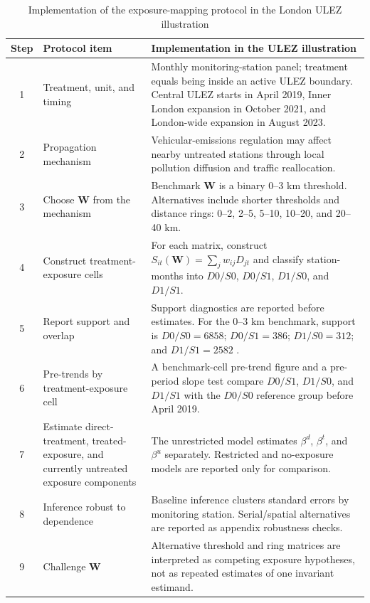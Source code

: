 \begin{table}[!htbp]\centering
\caption{Implementation of the exposure-mapping protocol in the London ULEZ illustration}
\label{tab:ulez_protocol_implementation}
\begin{threeparttable}
\small
\setlength{\tabcolsep}{3pt}
\renewcommand{\arraystretch}{1.15}
\begin{tabularx}{\textwidth}{@{}c>{\RaggedRight\arraybackslash}p{}>{\RaggedRight\arraybackslash}X@{}}
\toprule
Step & Protocol item & Implementation in the ULEZ illustration \\
\midrule
1 & Treatment, unit, and timing & Monthly monitoring-station panel; treatment equals being inside an active ULEZ boundary. Central ULEZ starts in April 2019, Inner London expansion in October 2021, and London-wide expansion in August 2023. \\
2 & Propagation mechanism & Vehicular-emissions regulation may affect nearby untreated stations through local pollution diffusion and traffic reallocation. \\
3 & Choose $\mathbf{W}$ from the mechanism & Benchmark $\mathbf{W}$ is a binary 0--3 km threshold. Alternatives include shorter thresholds and distance rings: 0--2, 2--5, 5--10, 10--20, and 20--40 km. \\
4 & Construct treatment-exposure cells & For each matrix, construct $S_{it}(\mathbf{W})=\sum_j w_{ij}D_{jt}$ and classify station-months into $D0/S0$, $D0/S1$, $D1/S0$, and $D1/S1$. \\
5 & Report support and overlap & Support diagnostics are reported before estimates. For the 0--3 km benchmark, support is $D0/S0=6858$; $D0/S1=386$; $D1/S0=312$; and $D1/S1=2582$ . \\
6 & Pre-trends by treatment-exposure cell & A benchmark-cell pre-trend figure and a pre-period slope test compare $D0/S1$, $D1/S0$, and $D1/S1$ with the $D0/S0$ reference group before April 2019. \\
7 & Estimate direct-treatment, treated-exposure, and currently untreated exposure components & The unrestricted model estimates $\beta^d$, $\beta^t$, and $\beta^u$ separately. Restricted and no-exposure models are reported only for comparison. \\
8 & Inference robust to dependence & Baseline inference clusters standard errors by monitoring station. Serial/spatial alternatives are reported as appendix robustness checks. \\
9 & Challenge $\mathbf{W}$ & Alternative threshold and ring matrices are interpreted as competing exposure hypotheses, not as repeated estimates of one invariant estimand. \\

\end{tabularx}
\end{threeparttable}
\end{table}
